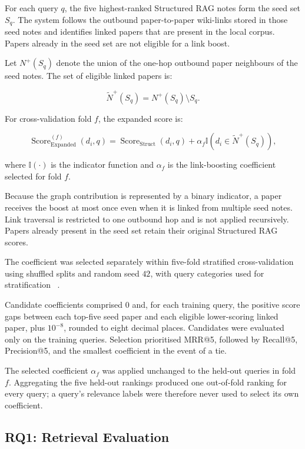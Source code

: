 \documentclass[runningheads]{llncs}
\begin{document}
For each query \(q\), the five highest-ranked Structured RAG notes form
the seed set \(S_q\). The system follows the outbound paper-to-paper
wiki-links stored in those seed notes and identifies linked papers that
are present in the local corpus. Papers already in the seed set are not
eligible for a link boost.

Let \(N^{+}(S_q)\) denote the union of the one-hop outbound paper
neighbours of the seed notes. The set of eligible linked papers is:

\[
\widetilde{N}^{+}(S_q)
=
N^{+}(S_q)\setminus S_q.
\]

For cross-validation fold \(f\), the expanded score is:

\[
\operatorname{Score}_{\mathrm{Expanded}}^{(f)}(d_i,q)
=
\operatorname{Score}_{\mathrm{Struct}}(d_i,q)
+
\alpha_f
\mathbb{I}
\left(
d_i \in \widetilde{N}^{+}(S_q)
\right),
\]

where \(\mathbb{I}(\cdot)\) is the indicator function and
\(\alpha_f\) is the link-boosting coefficient selected for fold \(f\).

Because the graph contribution is represented by a binary indicator, a
paper receives the boost at most once even when it is linked from
multiple seed notes. Link traversal is restricted to one outbound hop
and is not applied recursively. Papers already present in the seed set
retain their original Structured RAG scores.

The coefficient was selected separately within five-fold stratified
cross-validation using shuffled splits and random seed \(42\), with
query categories used for stratification
~\cite{kohavi1995study}.

Candidate coefficients comprised \(0\) and, for each training query,
the positive score gaps between each top-five seed paper and each
eligible lower-scoring linked paper, plus \(10^{-8}\), rounded to eight
decimal places. Candidates were evaluated only on the training queries.
Selection prioritised MRR@5, followed by Recall@5, Precision@5, and the
smallest coefficient in the event of a tie.

The selected coefficient \(\alpha_f\) was applied unchanged to the
held-out queries in fold \(f\). Aggregating the five held-out rankings
produced one out-of-fold ranking for every query; a query's relevance
labels were therefore never used to select its own coefficient.

\FloatBarrier

\subsection{RQ1: Retrieval Evaluation}
\label{sec:rq1_method}
\end{document}
